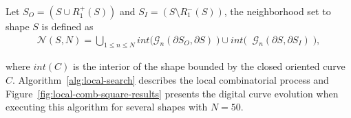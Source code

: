 Let $S_O = ( S \cup R_1^+(S) ) $ and $S_I = ( S \setminus R_1^-(S) ) $, the neighborhood set to shape $S$ is defined as
\begin{align*}
	\mathcal{N}(S,N) = \bigcup_{1 \leq n \leq N} int \big( \mathcal{G}_{n}(\partial S_O, \partial S) \; \big) \cup int \big( \;  \; \mathcal{G}_{n}(\partial S, \partial S_I) \; \big),
\end{align*}

where $int(C)$ is the interior of the shape bounded by the closed oriented curve $C$. Algorithm~\ref{alg:local-search} describes the local combinatorial process and Figure~\ref{fig:local-comb-square-results} presents the digital curve evolution when executing this algorithm for several shapes with $N=50$.


\begin{figure}[h!]
\center
{}\hspace{1em}%
\subfloat{
}
\end{figure}
